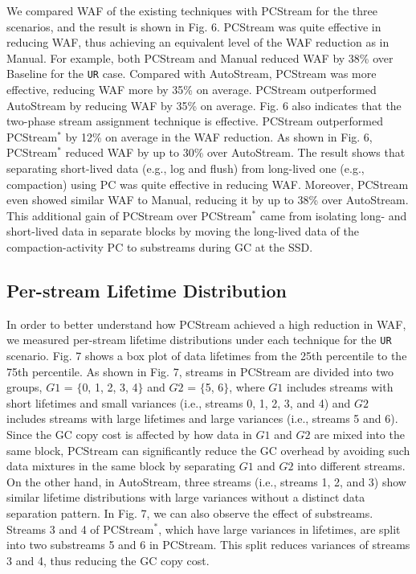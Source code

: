 {We compared WAF of the existing techniques with \textsf{\small PCStream} for the three
scenarios, and the result is shown in Fig. 6.  
\textsf{\small PCStream} was quite effective in reducing WAF, 
thus achieving an equivalent level of the WAF reduction as in \textsf{\small Manual}.  
For example, both \textsf{\small PCStream} and \textsf{\small Manual} reduced WAF by 38\% over \textsf{\small Baseline} for the \texttt{UR} case. 
Compared with \textsf{\small AutoStream}, \textsf{\small PCStream} was more effective, reducing WAF more by 35\% on average.  
\textsf{\small PCStream} outperformed \textsf{\small AutoStream} by reducing WAF by 35\% on average.
Fig. 6 also indicates that the two-phase stream assignment technique is effective.  
\textsf{\small PCStream} outperformed \textsf{\small PCStream$^{*}$} by 12\% on average in the WAF reduction.
As shown in Fig. 6, \textsf{\small PCStream$^*$} reduced WAF by up to 30\% over \textsf{\small AutoStream}.  
The result shows that separating short-lived data (e.g., log and flush) from long-lived one (e.g., compaction) using PC was quite effective in reducing WAF.  
Moreover, \textsf{\small PCStream} even showed similar WAF to \textsf{\small Manual}, reducing it by up to 38\% over \textsf{\small AutoStream}.  
This additional gain of \textsf{\small PCStream} over \textsf{\small PCStream$^{*}$} came from isolating long- and short-lived data in separate blocks 
by moving the long-lived data of the compaction-activity PC to substreams during GC at the SSD.

\subsection{Per-stream Lifetime Distribution}

In order to better understand how \textsf{\small PCStream} achieved a high reduction in WAF, 
we measured per-stream lifetime distributions under each technique for the \texttt{UR} scenario.
Fig. 7 shows a box plot of data lifetimes from the 25th percentile to the 75th percentile.
As shown in Fig. 7, 
streams in \textsf{\small PCStream} are divided into two groups, 
$G1$ = $\{$0, 1, 2, 3, 4$\}$ and $G2$ = $\{$5, 6$\}$, 
where $G1$ includes streams with short lifetimes and small variances (i.e., streams 0, 1, 2, 3, and 4) 
and $G2$ includes streams with large lifetimes and large variances (i.e., streams 5 and 6).  
Since the GC copy cost is affected by how data in $G1$ and $G2$ are mixed into the same block, 
\textsf{\small PCStream} can significantly reduce the GC overhead 
by avoiding such data mixtures in the same block by separating $G1$ and $G2$ into different streams. 
On the other hand, in \textsf{\small AutoStream}, 
three streams (i.e., streams 1, 2, and 3) show similar lifetime distributions with large variances 
without a distinct data separation pattern.
In Fig. 7, we can also observe the effect of substreams.  
Streams 3 and 4 of \textsf{\small PCStream$^{*}$}, 
which have large variances in lifetimes, are split into two substreams 5 and 6 in \textsf{\small PCStream}.
This split reduces variances of streams 3 and 4, thus reducing the GC copy cost.  

}
